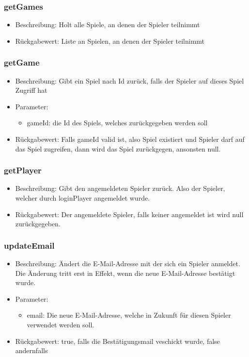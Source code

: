 \documentclass[a4paper]{scrreprt}
\begin{document}
	\subsubsection{getGames}
	\begin{itemize}
		\item Beschreibung: Holt alle Spiele, an denen der Spieler teilnimmt
		\item Rückgabewert: Liste an Spielen, an denen der Spieler teilnimmt
	\end{itemize}
	\subsubsection{getGame}
	\begin{itemize}
		\item Beschreibung: Gibt ein Spiel nach Id zurück, falls der Spieler auf dieses Spiel Zugriff hat
		\item Parameter:
		\begin{itemize}
			\item gameId: die Id des Spiels, welches zurückgegeben werden soll
		\end{itemize}
		\item Rückgabewert: Falls gameId valid ist, also Spiel existiert und Spieler darf auf das Spiel zugreifen, dann wird das Spiel zurückgegen, ansonsten null.
	\end{itemize}
	\subsubsection{getPlayer}
	\begin{itemize}
		\item Beschreibung: Gibt den angemeldeten Spieler zurück. Also der Spieler, welcher durch loginPlayer angemeldet wurde.
		\item Rückgabewert: Der angemeldete Spieler, falls keiner angemeldet ist wird null zurückgegeben.
	\end{itemize}
	\subsubsection{updateEmail}
	\begin{itemize}
		\item Beschreibung: Ändert die E-Mail-Adresse mit der sich ein Spieler anmeldet. Die Änderung tritt erst in Effekt, wenn die neue E-Mail-Adresse bestätigt wurde.
		\item Parameter:
		\begin{itemize}
			\item email: Die neue E-Mail-Adresse, welche in Zukunft für diesen Spieler verwendet werden soll.
		\end{itemize}
		\item Rückgabewert: true, falls die Bestätigungsmail veschickt wurde, false andernfalls
	\end{itemize}
\end{document}
